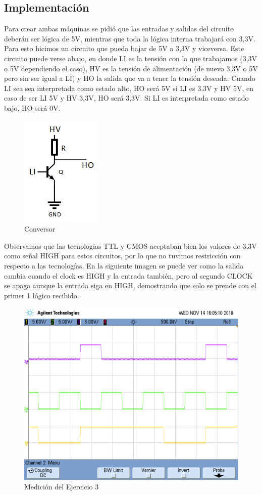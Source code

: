 \subsection*{Implementación}
Para crear ambas máquinas se pidió que las entradas y salidas del circuito deberán ser lógica de 5V, mientras que toda la lógica interna trabajará con 3,3V. Para esto hicimos un circuito que pueda bajar de 5V a 3,3V y viceversa. Este circuito puede verse abajo, en donde LI es la tensión con la que trabajamos (3,3V o 5V dependiendo el caso), HV es la tensión de alimentación (de nuevo 3,3V o 5V pero sin ser igual a LI) y HO la salida que va a tener la tensión deseada. Cuando LI sea sea interpretada como estado alto, HO será 5V si LI es 3.3V y HV 5V, en caso de ser LI 5V y HV 3,3V, HO será 3,3V. Si LI es interpretada como estado bajo, HO será 0V.

\begin{figure}[H]
	\centering
	\includegraphics[scale=1]{Imagenes/Conversor.jpg}
	\caption{Conversor}
\end{figure}

Observamos que las tecnologías TTL y CMOS aceptaban bien los valores de 3,3V como señal HIGH para estos circuitos, por lo que no tuvimos restricción con respecto a las tecnologías.
En la siguiente imagen se puede ver como la salida cambia cuando el clock es HIGH y la entrada también, pero al segundo CLOCK se apaga aunque la entrada siga en HIGH, demostrando que solo se prende con el primer 1 lógico recibido.
\begin{figure}[H]
	\centering
	\includegraphics[width=14cm]{Imagenes/MedicionTP3_Ej3.png}
	\caption{Medición del Ejercicio 3}
\end{figure}

